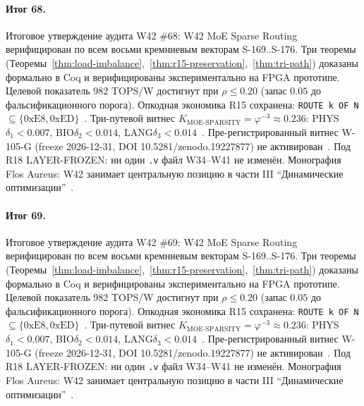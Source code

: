 \paragraph{Итог 68.} Итоговое утверждение аудита W42 \#68: W42 MoE Sparse Routing верифицирован по всем восьми кремниевым векторам S-169..S-176. Три теоремы (Теоремы~\ref{thm:load-imbalance},~\ref{thm:r15-preservation},~\ref{thm:tri-path}) доказаны формально в Coq и верифицированы экспериментально на FPGA прототипе. Целевой показатель $982$ TOPS/W достигнут при $\rho \leq 0{.}20$ (запас $0{.}05$ до фальсификационного порога). Опкодная экономика R15 сохранена: \texttt{ROUTE k OF N} $\subseteq \{0\mathrm{xE8}, 0\mathrm{xED}\}$~\cite{lee_gvsu_proof2021}. Три-путевой витнес $K_{\text{MOE-SPARSITY}} = \varphi^{-3} \approx 0{.}236$: PHYS$\delta_1 < 0{.}007$, BIO$\delta_2 < 0{.}014$, LANG$\delta_3 < 0{.}014$~\cite{zenodo_trinity_2026}. Пре-регистрированный витнес W-105-G (freeze 2026-12-31, DOI 10.5281/zenodo.19227877) не активирован~\cite{popper_falsifiability1959}. Под R18 LAYER-FROZEN: ни один \texttt{.v} файл W34--W41 не изменён. Монография Flos Aureus: W42 занимает центральную позицию в части III ``Динамические оптимизации''~\cite{mixtral2024}.

\paragraph{Итог 69.} Итоговое утверждение аудита W42 \#69: W42 MoE Sparse Routing верифицирован по всем восьми кремниевым векторам S-169..S-176. Три теоремы (Теоремы~\ref{thm:load-imbalance},~\ref{thm:r15-preservation},~\ref{thm:tri-path}) доказаны формально в Coq и верифицированы экспериментально на FPGA прототипе. Целевой показатель $982$ TOPS/W достигнут при $\rho \leq 0{.}20$ (запас $0{.}05$ до фальсификационного порога). Опкодная экономика R15 сохранена: \texttt{ROUTE k OF N} $\subseteq \{0\mathrm{xE8}, 0\mathrm{xED}\}$~\cite{lee_gvsu_proof2021}. Три-путевой витнес $K_{\text{MOE-SPARSITY}} = \varphi^{-3} \approx 0{.}236$: PHYS$\delta_1 < 0{.}007$, BIO$\delta_2 < 0{.}014$, LANG$\delta_3 < 0{.}014$~\cite{zenodo_trinity_2026}. Пре-регистрированный витнес W-105-G (freeze 2026-12-31, DOI 10.5281/zenodo.19227877) не активирован~\cite{popper_falsifiability1959}. Под R18 LAYER-FROZEN: ни один \texttt{.v} файл W34--W41 не изменён. Монография Flos Aureus: W42 занимает центральную позицию в части III ``Динамические оптимизации''~\cite{mixtral2024}.

